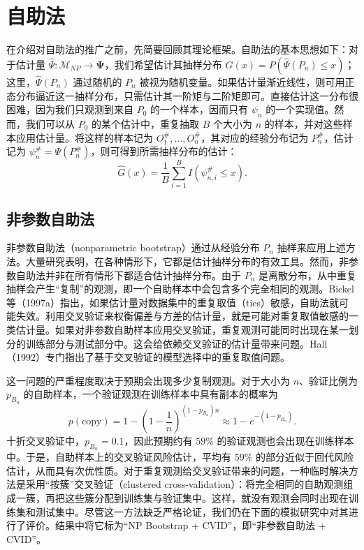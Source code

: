 \section{自助法}

在介绍对自助法的推广之前，先简要回顾其理论框架。自助法的基本思想如下：对于估计量 $\hat\Psi:\mathcal M_{NP}\to\boldsymbol\Psi$，我们希望估计其抽样分布
$G(x)=P(\hat\Psi(P_n)\leq x)$；这里，$\hat\Psi(P_n)$ 通过随机的 $P_n$ 被视为随机变量。如果估计量渐近线性，则可用正态分布逼近这一抽样分布，只需估计其一阶矩与二阶矩即可。直接估计这一分布很困难，因为我们只观测到来自 $P_0$ 的一个样本，因而只有 $\psi_n$ 的一个实现值。然而，我们可以从 $P_0$ 的某个估计中，重复抽取 $B$ 个大小为 $n$ 的样本，并对这些样本应用估计量。将这样的样本记为 $O_1^\#,\ldots,O_n^\#$，其对应的经验分布记为 $P_n^\#$，估计记为 $\psi_n^\#=\Psi(P_n^\#)$，则可得到所需抽样分布的估计：
\[
 \hat G(x)=\frac1B\sum_{i=1}^BI(\psi_{n,i}^\#\leq x).
\]

\subsection{非参数自助法}

非参数自助法（nonparametric bootstrap）通过从经验分布 $P_n$ 抽样来应用上述方法。大量研究表明，在各种情形下，它都是估计抽样分布的有效工具。然而，非参数自助法并非在所有情形下都适合估计抽样分布。由于 $P_n$ 是离散分布，从中重复抽样会产生“复制”的观测，即一个自助样本中会包含多个完全相同的观测。Bickel 等（1997a）指出，如果估计量对数据集中的重复取值（ties）敏感，自助法就可能失效。利用交叉验证来权衡偏差与方差的估计量，就是可能对重复取值敏感的一类估计量。如果对非参数自助样本应用交叉验证，重复观测可能同时出现在某一划分的训练部分与测试部分中。这会给依赖交叉验证的估计量带来问题。Hall（1992）专门指出了基于交叉验证的模型选择中的重复取值问题。

这一问题的严重程度取决于预期会出现多少复制观测。对于大小为 $n$、验证比例为 $p_{B_n}$ 的自助样本，一个验证观测在训练样本中具有副本的概率为
\[
 p(\mathrm{copy})=1-\left(1-\frac1n\right)^{(1-p_{B_n})n}
 \approx1-e^{-(1-p_{B_n})}.
\]
十折交叉验证中，$p_{B_n}=0.1$，因此预期约有 $59\%$ 的验证观测也会出现在训练样本中。于是，自助样本上的交叉验证风险估计，平均有 $59\%$ 的部分近似于回代风险估计，从而具有次优性质。对于重复观测给交叉验证带来的问题，一种临时解决方法是采用“按簇”交叉验证（clustered cross-validation）：将完全相同的自助观测组成一簇，再把这些簇分配到训练集与验证集中。这样，就没有观测会同时出现在训练集和测试集中。尽管这一方法缺乏严格论证，我们仍在下面的模拟研究中对其进行了评价。结果中将它标为“NP Bootstrap + CVID”，即“非参数自助法 + CVID”。

